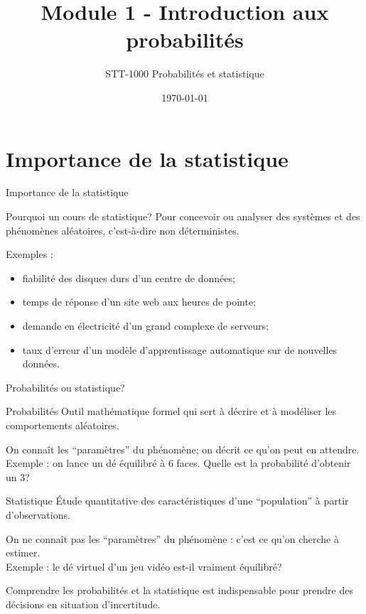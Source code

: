 \documentclass{BeamerTemplate}
\title{Module 1 - Introduction aux probabilités}
\subtitle{STT-1000 Probabilités et statistique}
\date{\today}
\begin{document}
\begin{frame}[t]
  \titlepage
\end{frame}

\section{Importance de la statistique}

\begin{frame}{Importance de la statistique}
  \begin{Boite}{Pourquoi un cours de statistique?}
    Pour concevoir ou analyser des systèmes et des phénomènes aléatoires, c'est-à-dire non déterministes.
  \end{Boite}
  Exemples :
  \begin{itemize}
    \item fiabilité des disques durs d'un centre de données;
    \item temps de réponse d'un site web aux heures de pointe;
    \item demande en électricité d'un grand complexe de serveurs;
    \item taux d'erreur d'un modèle d'apprentissage automatique sur de nouvelles données.
  \end{itemize}
\end{frame}

\begin{frame}{Probabilités ou statistique?}
  \small
  \begin{Boite}{Probabilités}
    Outil mathématique formel qui sert à décrire et à modéliser les comportements aléatoires.
  \end{Boite}
  On connaît les \enquote{paramètres} du phénomène; on décrit ce qu'on peut en attendre.\\
  Exemple : on lance un dé équilibré à 6 faces. Quelle est la probabilité d'obtenir un 3?

  \pause

  \begin{Boite}{Statistique}
    Étude quantitative des caractéristiques d'une \enquote{population} à partir d'observations.
  \end{Boite}
  On ne connaît pas les \enquote{paramètres} du phénomène : c'est ce qu'on cherche à estimer.\\
  Exemple : le dé virtuel d'un jeu vidéo est-il vraiment équilibré?

  \pause

  Comprendre les probabilités et la statistique est indispensable pour prendre des décisions en situation d'incertitude.
\end{frame}
\end{document}
